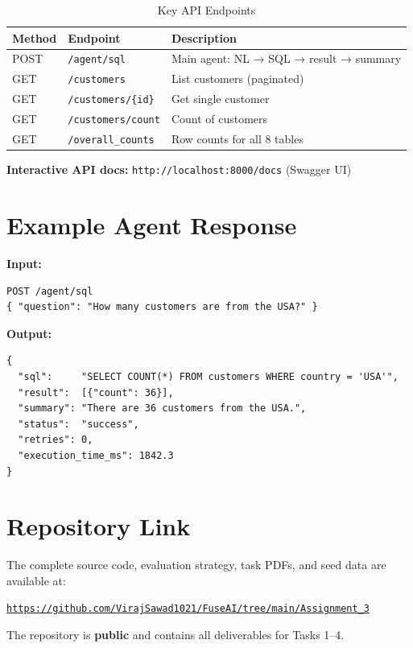 \documentclass[12pt, a4paper]{article}
\begin{document}
\begin{table}[h!]
\centering
\begin{tabular}{@{}lll@{}}
\toprule
\textbf{Method} & \textbf{Endpoint} & \textbf{Description} \\
\midrule
POST & \texttt{/agent/sql}            & Main agent: NL → SQL → result → summary \\
GET  & \texttt{/customers}            & List customers (paginated) \\
GET  & \texttt{/customers/\{id\}}     & Get single customer \\
GET  & \texttt{/customers/count}      & Count of customers \\
GET  & \texttt{/overall\_counts}      & Row counts for all 8 tables \\
\bottomrule
\end{tabular}
\caption{Key API Endpoints}
\end{table}

\textbf{Interactive API docs:} \texttt{http://localhost:8000/docs} (Swagger UI)

\section{Example Agent Response}

\textbf{Input:}
\begin{verbatim}
POST /agent/sql
{ "question": "How many customers are from the USA?" }
\end{verbatim}

\textbf{Output:}
\begin{verbatim}
{
  "sql":     "SELECT COUNT(*) FROM customers WHERE country = 'USA'",
  "result":  [{"count": 36}],
  "summary": "There are 36 customers from the USA.",
  "status":  "success",
  "retries": 0,
  "execution_time_ms": 1842.3
}
\end{verbatim}

\section{Repository Link}

The complete source code, evaluation strategy, task PDFs, and seed data are available at:

\begin{center}
    \Large
    \href{https://github.com/VirajSawad1021/FuseAI/tree/main/Assignment_3}{%
    \texttt{https://github.com/VirajSawad1021/FuseAI/tree/main/Assignment\_3}}
\end{center}

The repository is \textbf{public} and contains all deliverables for Tasks 1–4.
\end{document}
